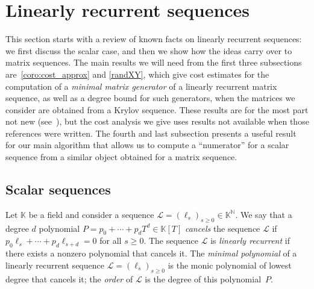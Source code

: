 \documentclass[final,1p,times,authoryear]{elsarticle}
\newcommand{\minpoly}{P}
\def\N {\ensuremath{\mathbb{N}}}
\def\K{\mathbb{K}}
\def\K {\ensuremath{\mathbb{K}}}
\begin{document}

\section{Linearly recurrent sequences}

This section starts with a review of known facts on linearly recurrent
sequences: we first discuss the scalar case, and then we show how the ideas
carry over to matrix sequences. 
The main results we will need from the first three subsections
are~\cref{coro:cost_approx} and \cref{randXY}, which give cost
estimates for the computation of a {\em minimal matrix generator} of a
linearly recurrent matrix sequence, as well as a degree bound for such
generators, when the matrices we consider are obtained from a Krylov
sequence. These results are for the most part not new
(see~\citep{Villard97,Villard97a,KalVil01,Turner02,KaVi04}), but the
cost analysis we give uses results not available when those references
were written.  The fourth and last subsection presents a useful result
for our main algorithm that allows us to compute a ``numerator'' for a
scalar sequence from a similar object obtained for a matrix sequence.


\subsection{Scalar sequences} \label{section:linseq}

Let $\K$ be a field and consider a sequence $\mathcal{L}=(\ell_s)_{s
\ge 0} \in \K^\N$. We say that a degree $d$ polynomial $\minpoly =
p_0 + \cdots + p_d T^d \in\K[T]$ {\em cancels} the sequence
$\mathcal{L}$ if $p_0 \ell_s + \cdots + p_d \ell_{s+d}=0$ for all $s
\ge 0$. The sequence $\mathcal{L}$ is {\em linearly recurrent} if
there exists a nonzero polynomial that cancels it.  The {\em minimal
polynomial} of a linearly recurrent sequence
$\mathcal{L}=(\ell_s)_{s \ge 0}$ is the monic polynomial of lowest
degree that cancels it; the {\em order} of $\mathcal{L}$ is the degree
of this polynomial~$\minpoly$.

\end{document}

